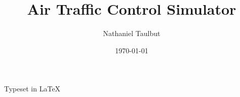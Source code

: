 \documentclass{article}
\title{Air Traffic Control Simulator}
\author{Nathaniel Taulbut}
\date{\today}
\begin{document}
\begin{titlepage}
    \maketitle
    \vspace{70pt}
    \noindent{}
\end{titlepage}
\clearpage

\tableofcontents
\clearpage

\listoffigures
\lstlistoflistings

\vfill
\begin{center}
Typeset in \textrm{\LaTeX{}}
\end{center}

\clearpage
\end{document}
